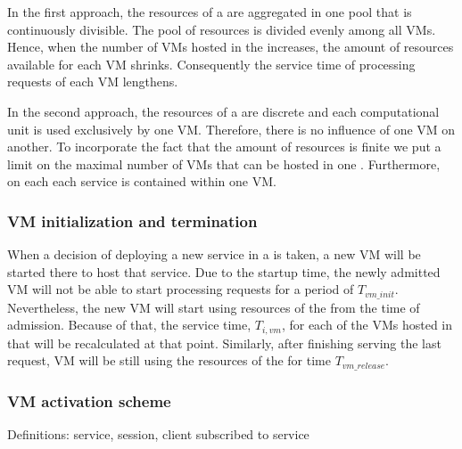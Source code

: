 In the first approach, the resources of a \dc{} are aggregated in one pool that is continuously divisible.
The pool of resources is divided evenly among all VMs.
Hence, when the number of VMs hosted in the \dc{} increases, the amount of resources available for each VM shrinks.
Consequently the service time of processing requests of each VM lengthens.

In the second approach, the resources of a \dc{} are discrete and each computational unit is used exclusively by one VM.
Therefore, there is no influence of one VM on another.
To incorporate the fact that the amount of resources is finite we put a limit on the maximal number of VMs that can be hosted in one \dc{}.
Furthermore, on each \dc each service is contained within one VM. 

\subsubsection{VM initialization and termination}
When a decision of deploying a new service in a \dc{} is taken, a new VM will be started there to host that service.
Due to the startup time, the newly admitted VM will not be able to start processing requests for a period of $T_{vm\_init}$. 
Nevertheless, the new VM will start using resources of the \dc{} from the time of admission.
Because of that, the service time, $T_{i,vm}$, for each of the VMs hosted in that \dc{} will be recalculated at that point.
Similarly, after finishing serving the last request, VM will be still using the resources of the \dc{} for time $T_{vm\_release}$.

\subsubsection{VM activation scheme}
Definitions: service, session, client subscribed to service 

